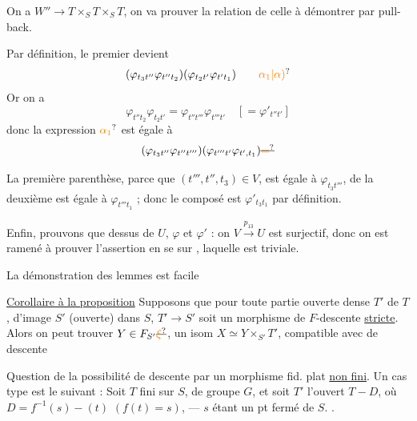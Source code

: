 On a $W''\to T\times_S T\times_S T$, on va prouver la relation  de celle à démontrer par pull-back.

Par définition, le premier  devient
\[
(\varphi_{t_3t''}\varphi_{t''t_2})(\varphi_{t_2t'}\varphi_{t't_1})\tag*{\unsure{$\alpha_1$|$\alpha)$}}
\]
Or on a
\[
\varphi_{t''t_2}\varphi_{t_2t'}=\varphi_{t''t'''}\varphi_{t'''t'}\quad [=\varphi'_{t''t'}]
\]
donc la  expression $\unsure{\alpha_1}$ est égale à
\[
(\varphi_{t_3t''}\varphi_{t''t'''})
(\varphi_{t'''t'}\varphi_{t',t_1})\deleted{\unsure{=}}
\]

La première parenthèse, parce que $(t''',t'',t_3)\in V$, est égale à $\varphi_{t_3t'''}$, de  la deuxième est égale à $\varphi_{t'''t_1}$ ; donc le composé est $\varphi'_{t_3t_1}$ par définition.

Enfin, prouvons que  dessus de $U$, $\varphi$ et $\varphi'$  : on   $V\xrightarrow{p_{13}}U$ est surjectif,  donc on est ramené à prouver l'assertion  en se  sur , laquelle est triviale.


La démonstration des lemmes est facile

\uline{Corollaire à la proposition} Supposons que pour toute partie ouverte dense $T'$ de $T$, d'image $S'$ (ouverte) dans $S$, $T'\to S'$ soit un morphisme de $F$-descente \uline{stricte}. Alors on peut trouver  $Y\in F_{S'}\deleted{\unsure{\xi}}$,  un isom $X\simeq Y\times_{S'}T'$, compatible avec  de descente

Question de la possibilité de descente par un morphisme fid. plat \uline{non fini}. Un cas type est le suivant : Soit $T$   fini sur $S$, de groupe $G$, et  soit $T'$ l'ouvert  $T-D$, où $D=f^{-1}(s)-(t)$ $(f(t)=s)$, --- $s$ étant un pt fermé de $S$. .

